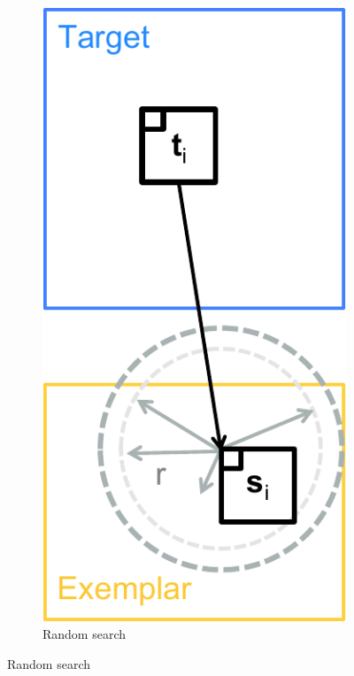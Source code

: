 \begin{figure}[ht]
\begin{subfigure}[t]{0.155\textwidth}
	\end{subfigure}
	\begin{subfigure}[t]{0.155\textwidth}
		\includegraphics[width=\textwidth]{figures/randsearch_text}
		\caption{Random search}
	\end{subfigure}

\end{figure}
